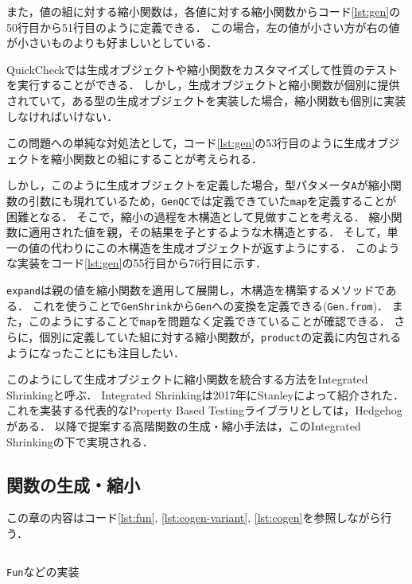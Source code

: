 \documentclass[submit,PRO]{ipsj}
\theoremstyle{definition}
\begin{document}
また，値の組に対する縮小関数は，各値に対する縮小関数からコード\ref{lst:gen}の50行目から51行目のように定義できる．
この場合，左の値が小さい方が右の値が小さいものよりも好ましいとしている．

QuickCheckでは生成オブジェクトや縮小関数をカスタマイズして性質のテストを実行することができる．
しかし，生成オブジェクトと縮小関数が個別に提供されていて，ある型の生成オブジェクトを実装した場合，縮小関数も個別に実装しなければいけない．

この問題への単純な対処法として，コード\ref{lst:gen}の53行目のように生成オブジェクトを縮小関数との組にすることが考えられる．

しかし，このように生成オブジェクトを定義した場合，型パタメータ\texttt{A}が縮小関数の引数にも現れているため，\texttt{GenQC}では定義できていた\texttt{map}を定義することが困難となる．
そこで，縮小の過程を木構造として見做すことを考える．
縮小関数に適用された値を親，その結果を子とするような木構造とする．
そして，単一の値の代わりにこの木構造を生成オブジェクトが返すようにする．
このような実装をコード\ref{lst:gen}の55行目から76行目に示す．

\texttt{expand}は親の値を縮小関数を適用して展開し，木構造を構築するメソッドである．
これを使うことで\texttt{GenShrink}から\texttt{Gen}への変換を定義できる(\texttt{Gen.from})．
また，このようにすることで\texttt{map}を問題なく定義できていることが確認できる．
さらに，個別に定義していた組に対する縮小関数が，\texttt{product}の定義に内包されるようになったことにも注目したい．

このようにして生成オブジェクトに縮小関数を統合する方法をIntegrated Shrinkingと呼ぶ．
Integrated Shrinkingは2017年にStanleyによって紹介された\cite{stanley_gens_2017}．
これを実装する代表的なProperty Based Testingライブラリとしては，Hedgehog\cite{hedgehog_online}がある．
以降で提案する高階関数の生成・縮小手法は，このIntegrated Shrinkingの下で実現される．

\subsection{関数の生成・縮小}

この章の内容はコード\ref{lst:fun}, \ref{lst:cogen-variant}, \ref{lst:cogen}を参照しながら行う．

\begin{listing*}[hbt]
  \inputminted[breaklines,autogobble,linenos,firstline=78,lastline=127]{scala}{../src/main/scala/minicheck.scala}
  \caption{\texttt{Fun}などの実装}
  \label{lst:fun}
\end{listing*}
\end{document}
